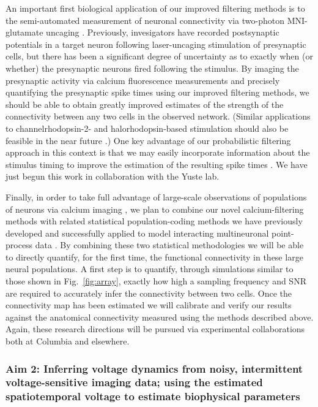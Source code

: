 \documentclass[12pt]{article}
\begin{document}
An important first biological application of our improved filtering
methods is to the semi-automated measurement of neuronal connectivity
via two-photon MNI-glutamate uncaging \cite{Vovan07}.  Previously,
invesigators have recorded postsynaptic potentials in a target neuron
following laser-uncaging stimulation of presynaptic cells, but there
has been a significant degree of uncertainty as to exactly when (or
whether) the presynaptic neurons fired following the stimulus.  By
imaging the presynaptic activity via calcium fluorescence measurements
and precisely quantifying the presynaptic spike times using our
improved filtering methods, we should be able to obtain greatly
improved estimates of the strength of the connectivity between any two
cells in the observed network.  (Similar applications to
channelrhodopsin-2- and halorhodopsin-based stimulation should also be
feasible in the near future \cite{Deisseroth05}.)  One key advantage
of our probabilistic filtering approach in this context is that we may
easily incorporate information about the stimulus timing to improve
the estimation of the resulting spike times \cite{Vogelstein07}.  We
have just begun this work in collaboration with the Yuste lab.

Finally, in order to take full advantage of large-scale observations
of populations of neurons via calcium imaging
\cite{CAR03,Kerr05,OhkiReid06,DombeckTank07,Holekamp08}, we plan to
combine our novel calcium-filtering methods with related statistical
population-coding methods we have previously developed and
successfully applied to model interacting multineuronal point-process
data \cite{PAN03d,SHO03,KP06,PILL07,PAN06c}.  By combining these two
statistical methodologies we will be able to directly quantify, for
the first time, the functional connectivity in these large neural
populations.  A first step is to quantify, through simulations similar
to those shown in Fig.~\ref{fig:array}, exactly how high a sampling
frequency and SNR are required to accurately infer the connectivity
between two cells.  Once the connectivity map has been estimated we
will calibrate and verify our results against the anatomical
connectivity measured using the methods described above.  Again, these
research directions will be pursued via experimental collaborations
both at Columbia and elsewhere.



\subsubsection*{Aim 2: Inferring voltage dynamics from noisy, intermittent
voltage-sensitive imaging data; using the estimated spatiotemporal
voltage to estimate biophysical parameters}
\end{document}
